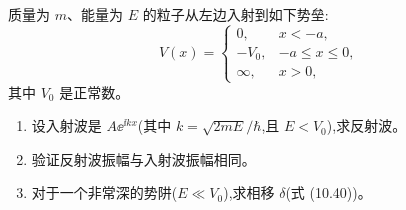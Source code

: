 \begin{question}
质量为 $m$、能量为 $E$ 的粒子从左边入射到如下势垒:
\[
V(x)=\begin{cases}
0,&x<-a,\\
-V_0,&-a\le x\le 0,\\
\infty,&x>0,
\end{cases}
\]
其中 $V_0$ 是正常数。
\begin{enumerate}
\item 设入射波是 $A\ee^{\ii kx}$(其中 $k=\sqrt{2mE}/\hbar$,且 $E<V_0$),求反射波。
\item 验证反射波振幅与入射波振幅相同。
\item 对于一个非常深的势阱($E\ll V_0$),求相移 $\delta$(式 (10.40))。
\end{enumerate}

\par\smallskip
{}

\end{question}
